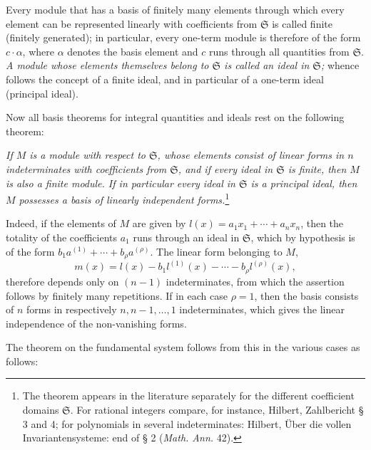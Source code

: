 \documentclass[11pt]{article}
\providecommand{\frS}{\mathfrak S}
\begin{document}
Every module that has a basis of finitely many elements through which every element can be represented linearly with coefficients from \(\frS\) is called finite (finitely generated); in particular, every one-term module is therefore of the form \(c\cdot\alpha\), where \(\alpha\) denotes the basis element and \(c\) runs through all quantities from \(\frS\). \emph{A module whose elements themselves belong to \(\frS\) is called an ideal in \(\frS\);} whence follows the concept of a finite ideal, and in particular of a one-term ideal (principal ideal).

Now all basis theorems for integral quantities and ideals rest on the following theorem:

\emph{If \(M\) is a module with respect to \(\frS\), whose elements consist of linear forms in \(n\) indeterminates with coefficients from \(\frS\), and if every ideal in \(\frS\) is finite, then \(M\) is also a finite module. If in particular every ideal in \(\frS\) is a principal ideal, then \(M\) possesses a basis of linearly independent forms.}\footnote{The theorem appears in the literature separately for the different coefficient domains \(\frS\). For rational integers compare, for instance, Hilbert, Zahlbericht § 3 and 4; for polynomials in several indeterminates: Hilbert, Über die vollen Invariantensysteme: end of § 2 (\emph{Math. Ann.} 42).}

Indeed, if the elements of \(M\) are given by \(l(x)=a_1x_1+\cdots+a_nx_n\), then the totality of the coefficients \(a_1\) runs through an ideal in \(\frS\), which by hypothesis is of the form \(b_1a^{(1)}+\cdots+b_\rho a^{(\rho)}\). The linear form belonging to \(M\),
\[
m(x)=l(x)-b_1l^{(1)}(x)-\cdots-b_\rho l^{(\rho)}(x),
\]
therefore depends only on \((n-1)\) indeterminates, from which the assertion follows by finitely many repetitions. If in each case \(\rho=1\), then the basis consists of \(n\) forms in respectively \(n,n-1,\ldots,1\) indeterminates, which gives the linear independence of the non-vanishing forms.

The theorem on the fundamental system follows from this in the various cases as follows:
\end{document}
